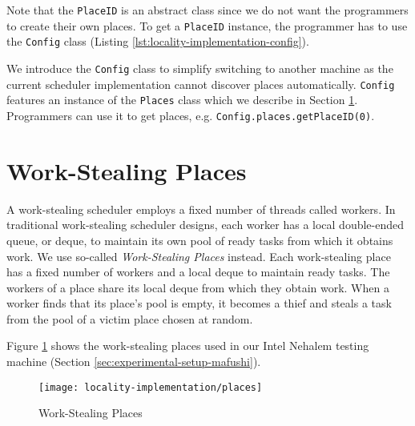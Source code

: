 

Note that the \lstinline!PlaceID! is an abstract class since we do not
want the programmers to create their own places. To get a
\lstinline!PlaceID!  instance, the programmer has to use the
\lstinline!Config! class (Listing
\ref{lst:locality-implementation-config}).



We introduce the \lstinline!Config! class to simplify switching to
another machine as the current scheduler implementation cannot
discover places automatically. \lstinline!Config! features an instance
of the \lstinline!Places! class which we describe in Section
\ref{sec:locality-implementation-work-stealing-places}. Programmers
can use it to get places,
e.g. \lstinline!Config.places.getPlaceID(0)!.


\section{Work-Stealing Places}
\label{sec:locality-implementation-work-stealing-places}

A work-stealing scheduler employs a fixed number of threads called
workers. In traditional work-stealing scheduler designs, each worker
has a local double-ended queue, or deque, to maintain its own pool of
ready tasks from which it obtains work. We use so-called
\emph{Work-Stealing Places} instead. Each work-stealing place has a
fixed number of workers and a local deque to maintain ready tasks. The
workers of a place share its local deque from which they obtain
work. When a worker finds that its place's pool is empty, it becomes a
thief and steals a task from the pool of a victim place chosen at
random.

Figure \ref{fig:locality-implementation-work-stealing-places} shows
the work-stealing places used in our Intel Nehalem testing machine
(Section \ref{sec:experimental-setup-mafushi}).

\begin{figure}[!ht]
  \centering
  \texttt{[image: locality-implementation/places]}
  \caption{Work-Stealing Places}
  \label{fig:locality-implementation-work-stealing-places}
\end{figure}

